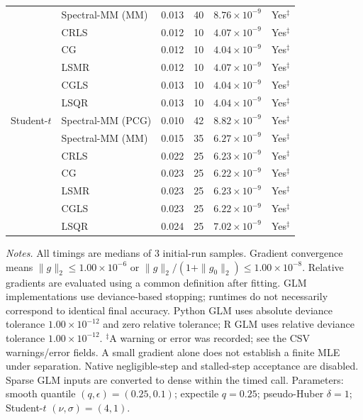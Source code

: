 \documentclass[10pt,a4paper]{article}
\begin{document}
\begin{longtable}{llrrrc}
 & Spectral-MM (MM) & 0.013 & 40 & $8.76\times10^{-9}$ & Yes$^{\ddagger}$ \\
 & CRLS & 0.012 & 10 & $4.07\times10^{-9}$ & Yes$^{\ddagger}$ \\
 & CG & 0.012 & 10 & $4.04\times10^{-9}$ & Yes$^{\ddagger}$ \\
 & LSMR & 0.012 & 10 & $4.07\times10^{-9}$ & Yes$^{\ddagger}$ \\
 & CGLS & 0.013 & 10 & $4.04\times10^{-9}$ & Yes$^{\ddagger}$ \\
 & LSQR & 0.013 & 10 & $4.04\times10^{-9}$ & Yes$^{\ddagger}$ \\
\midrule
Student-$t$ & Spectral-MM (PCG) & 0.010 & 42 & $8.82\times10^{-9}$ & Yes$^{\ddagger}$ \\
 & Spectral-MM (MM) & 0.015 & 35 & $6.27\times10^{-9}$ & Yes$^{\ddagger}$ \\
 & CRLS & 0.022 & 25 & $6.23\times10^{-9}$ & Yes$^{\ddagger}$ \\
 & CG & 0.023 & 25 & $6.22\times10^{-9}$ & Yes$^{\ddagger}$ \\
 & LSMR & 0.023 & 25 & $6.23\times10^{-9}$ & Yes$^{\ddagger}$ \\
 & CGLS & 0.023 & 25 & $6.22\times10^{-9}$ & Yes$^{\ddagger}$ \\
 & LSQR & 0.024 & 25 & $7.02\times10^{-9}$ & Yes$^{\ddagger}$ \\
\end{longtable}
\noindent\textit{Notes.} All timings are medians of 3 initial-run samples.
Gradient convergence means $\|g\|_2\leq 1.00\times10^{-6}$ or $\|g\|_2/(1+\|g_0\|_2)\leq 1.00\times10^{-8}$.
Relative gradients are evaluated using a common definition after fitting. GLM implementations use deviance-based stopping; runtimes do not necessarily correspond to identical final accuracy.
Python GLM uses absolute deviance tolerance $1.00\times10^{-12}$ and zero relative tolerance; R GLM uses relative deviance tolerance $1.00\times10^{-12}$.
$^{\ddagger}$A warning or error was recorded; see the CSV warnings/error fields. A small gradient alone does not establish a finite MLE under separation.
Native negligible-step and stalled-step acceptance are disabled.
Sparse GLM inputs are converted to dense within the timed call.
Parameters: smooth quantile $(q,\epsilon)=(0.25,0.1)$; expectile $q=0.25$; pseudo-Huber $\delta=1$; Student-$t$ $(\nu,\sigma)=(4,1)$.
\par
\endgroup
\end{document}
